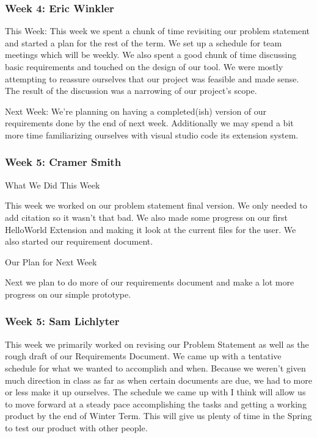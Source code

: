 \subsubsection{Week 4: Eric Winkler}

This Week:
This week we spent a chunk of time revisiting our problem statement and started a plan for the rest of the term. We set up a schedule for team meetings which will be weekly. We also spent a good chunk of time discussing basic requirements and touched on the design of our tool. We were mostly attempting to reassure ourselves that our project was feasible and made sense. The result of the discussion was a narrowing of our project's scope.

Next Week:
We're planning on having a completed(ish) version of our requirements done by the end of next week. Additionally we may spend a bit more time familiarizing ourselves with visual studio code its extension system.

\subsubsection{Week 5: Cramer Smith}

What We Did This Week 

This week we worked on our problem statement final version. We only needed to add citation so it wasn't that bad. We also made some progress on our first HelloWorld Extension and making it look at the current files for the user. We also started our requirement document.

Our Plan for Next Week

Next we plan to do more of our requirements document and make a lot more progress on our simple prototype. 

\subsubsection{Week 5: Sam Lichlyter}

This week we primarily worked on revising our Problem Statement as well as the rough draft of our Requirements Document. We came up with a tentative schedule for what we wanted to accomplish and when. Because we weren't given much direction in class as far as when certain documents are due, we had to more or less make it up ourselves. The schedule we came up with I think will allow us to move forward at a steady pace accomplishing the tasks and getting a working product by the end of Winter Term. This will give us plenty of time in the Spring to test our product with other people.

